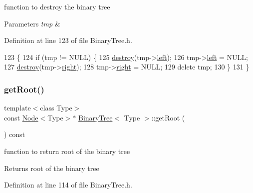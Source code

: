 function to destroy the binary tree 
\begin{DoxyParams}{Parameters}
{\em tmp} & \\
\hline
\end{DoxyParams}


Definition at line 123 of file Binary\+Tree.\+h.


\begin{DoxyCode}
123                                   \{
124         \textcolor{keywordflow}{if} (tmp != NULL)    \{
125             \hyperlink{class_binary_tree_a9b20827d019844170bb09465f885fef4}{destroy}(tmp->\hyperlink{class_node_abb08a8b3137dd8fc8874348a439e01b4}{left});
126             tmp->\hyperlink{class_node_abb08a8b3137dd8fc8874348a439e01b4}{left} = NULL;
127             \hyperlink{class_binary_tree_a9b20827d019844170bb09465f885fef4}{destroy}(tmp->\hyperlink{class_node_a34452c0684d3cb1590406ad201b43e65}{right});
128             tmp->\hyperlink{class_node_a34452c0684d3cb1590406ad201b43e65}{right} = NULL;
129             \textcolor{keyword}{delete} tmp;
130         \}
131     \}
\end{DoxyCode}
\mbox{\label{class_binary_tree_a9ee0cf09781cf2ecc471aacc61848dde}} 
\subsubsection{\texorpdfstring{get\+Root()}{getRoot()}}
{\footnotesize\ttfamily template$<$class Type$>$ \\
const \hyperlink{class_node}{Node}$<$Type$>$$\ast$ \hyperlink{class_binary_tree}{Binary\+Tree}$<$ Type $>$\+::get\+Root (\begin{DoxyParamCaption}{ }\end{DoxyParamCaption}) const\hspace{0.3cm}{\ttfamily [inline]}}

function to return root of the binary tree \begin{DoxyReturn}{Returns}
root of the binary tree 
\end{DoxyReturn}


Definition at line 114 of file Binary\+Tree.\+h.


